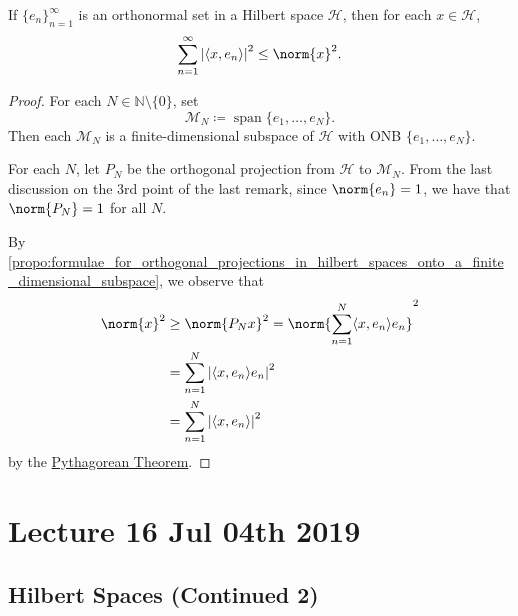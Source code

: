 \documentclass[notoc,notitlepage]{tufte-book}
\DeclareMathOperator{\Span}{span}
\begin{document}
\begin{thm}\label{thm:bessel_s_inequality}
  If $\{ e_n \}_{n=1}^{\infty}$ is an orthonormal set
  in a Hilbert space $\mathcal{H}$, then for each $x \in \mathcal{H}$,
  \begin{equation*}
    \sum_{n=1}^{\infty} \abs{ \langle x, e_n \rangle }^2 \leq \norm{x}^2.
  \end{equation*}
\end{thm}

\begin{proof}
  For each $N \in \mathbb{N} \setminus \{ 0 \}$, set
  \begin{equation*}
    \mathcal{M}_N \coloneqq \Span \{ e_1, \ldots, e_N \}.
  \end{equation*}
  Then each $\mathcal{M}_N$ is a finite-dimensional subspace of $\mathcal{H}$
  with ONB $\{ e_1, \ldots, e_N \}$.

  For each $N$, let $P_N$ be the orthogonal projection from $\mathcal{H}$ to $\mathcal{M}_N$.
  From the last discussion on the 3rd point of the last remark,
  since $\norm{e_n} = 1$, we have that $\norm{P_N} = 1$ for all $N$.

  By
  \cref{propo:formulae_for_orthogonal_projections_in_hilbert_spaces_onto_a_finite_dimensional_subspace},
  we observe that
  \begin{align*}
    \norm{x}^2 &\geq \norm{P_N x}^2
               = \norm{ \sum_{n=1}^{N} \langle x, e_n \rangle e_n }^2 \\
              &= \sum_{n=1}^{N} \abs{\langle x, e_n \rangle e_n}^2 \\
              &= \sum_{n=1}^{N} \abs{\langle x, e_n \rangle}^2
  \end{align*}
  by the \hyperref[thm:the_pythagorean_theorem_and_parallelogram_law]{Pythagorean Theorem}.
\end{proof}



\chapter{Lecture 16 Jul 04th 2019}%
\label{chp:lecture_16_jul_04th_2019}

\section{Hilbert Spaces (Continued 2)}%
\label{sec:hilbert_spaces_continued_2}
\end{document}
